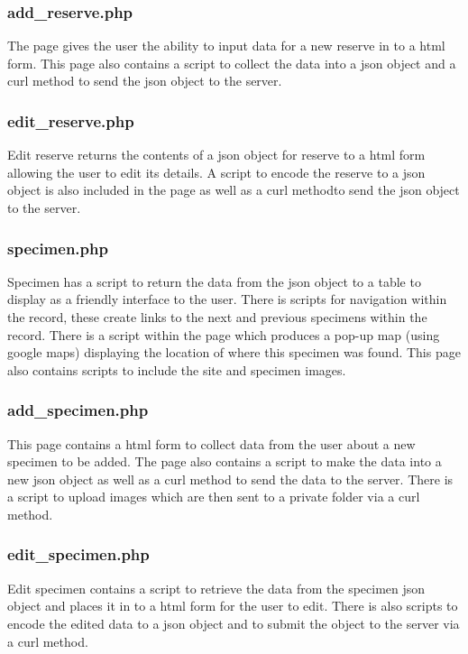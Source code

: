         
    \subsubsection{add\_reserve.php}
        The page gives the user the ability to input data for a new reserve in to a html form. This page also contains a script to collect the data into a json object and a curl method to send the json object to the server.

        
    \subsubsection{edit\_reserve.php}
        Edit reserve returns the contents of a json object for reserve to a html form allowing the user to edit its details. A script to encode the reserve to a json object is also included in the page as well as a curl methodto send the json object to the server.

        
    \subsubsection{specimen.php}
        Specimen has a script to return the data from the json object to a table to display as a friendly interface to the user. There is scripts for navigation within the record, these create links to the next and previous specimens within the record. There is a script within the page which produces a pop-up map (using google maps) displaying the location of where this specimen was found. This page also contains scripts to include the site and specimen images.

        
    \subsubsection{add\_specimen.php}
        This page contains a html form to collect data from the user about a new specimen to be added. The page also contains a script to make the data into a new json object as well as a curl method to send the data to the server. There is a script to upload images which are then sent to a private folder via a curl method.

        
    \subsubsection{edit\_specimen.php}
        Edit specimen contains a script to retrieve the data from the specimen json object and places it in to a html form for the user to edit. There is also scripts to encode the edited data to a json object and to submit the object to the server via a curl method.

